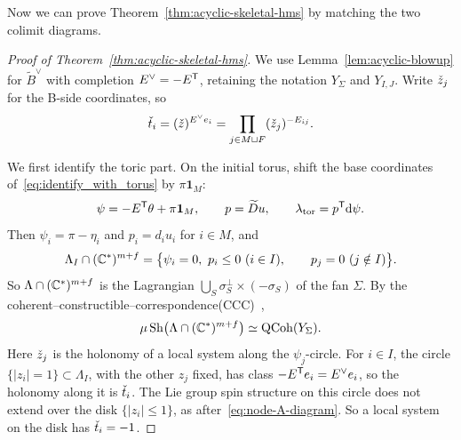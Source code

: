 \documentclass[12pt, letter]{amsart}
\theoremstyle{definition}
\begin{document}
Now we can prove Theorem~\ref{thm:acyclic-skeletal-hms} by matching the two colimit diagrams. 
\begin{proof}[Proof of Theorem~\ref{thm:acyclic-skeletal-hms}]
We use Lemma~\ref{lem:acyclic-blowup} for $\widetilde B^\vee$ with completion $E^\vee=-E^{\mathsf T}$, retaining the notation $Y_\Sigma$ and $Y_{I,J}$.
Write $\check z_j$ for the B-side coordinates, so
\[
 \check t_i=(\check z)^{E^\vee e_i}=\prod_{j\in M\sqcup F}(\check z_j)^{-E_{ij}}.
\]

We first identify the toric part.
On the initial torus, shift the base coordinates of~\eqref{eq:identify_with_torus} by $\pi\mathbf 1_M$:
\[
 \psi=-E^{\mathsf T}\theta+\pi\mathbf1_M,\qquad p=\widetilde Du,\qquad \lambda_{\mathrm{tor}}=p^{\mathsf T}\mathrm{d}\psi .
\]
Then $\psi_i=\pi-\eta_i$ and $p_i=d_iu_i$ for $i\in M$, and
\[
 \Lambda_I\cap(\bC^*)^{m+f}=\bigl\{\psi_i=0,\ p_i\le0\ (i\in I),\qquad p_j=0\ (j\notin I)\bigr\}.
\]
So $\Lambda\cap(\mathbb{C}^*)^{m+f}$ is the Lagrangian $\bigcup_S\sigma_S^\perp\times(-\sigma_S)$ of the fan $\Sigma$. By the coherent--constructible--correspondence(CCC)~\cite{FLTZ,Kuwagaki},
\[
\mu\operatorname{Sh}\bigl(\Lambda\cap(\mathbb{C}^*)^{m+f}\bigr)\simeq\operatorname{QCoh}(Y_\Sigma).
\]
Here $\check z_j$ is the holonomy of a local system along the $\psi_j$-circle.
For $i\in I$, the circle $\{|z_i|=1\}\subset\Lambda_I$, with the other $z_j$ fixed, has class $-E^{\mathsf T}e_i=E^\vee e_i$, so the holonomy along it is $\check t_i$.
The Lie group spin structure on this circle does not extend over the disk $\{|z_i|\le1\}$, as after~\eqref{eq:node-A-diagram}.
So a local system on the disk has $\check t_i=-1$.


\end{proof}
\end{document}
